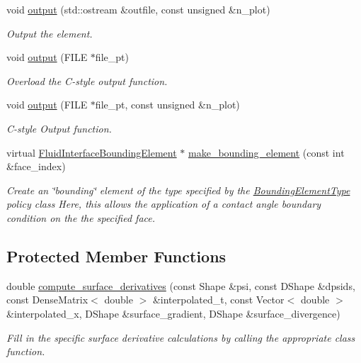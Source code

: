\begin{DoxyCompactItemize}
void \hyperlink{classoomph_1_1SpineUpdateFluidInterfaceElement_a3c9c00def11f68f48db0f46004f1e6fe}{output} (std\+::ostream \&outfile, const unsigned \&n\+\_\+plot)
\begin{DoxyCompactList}\small\item\em Output the element. \end{DoxyCompactList}\item 
void \hyperlink{classoomph_1_1SpineUpdateFluidInterfaceElement_a963fdd8b603e563da9fb966e0c429457}{output} (F\+I\+LE $\ast$file\+\_\+pt)
\begin{DoxyCompactList}\small\item\em Overload the C-\/style output function. \end{DoxyCompactList}\item 
void \hyperlink{classoomph_1_1SpineUpdateFluidInterfaceElement_af876d90d19b6faa253260193ded3f175}{output} (F\+I\+LE $\ast$file\+\_\+pt, const unsigned \&n\+\_\+plot)
\begin{DoxyCompactList}\small\item\em C-\/style Output function. \end{DoxyCompactList}\item 
virtual \hyperlink{classoomph_1_1FluidInterfaceBoundingElement}{Fluid\+Interface\+Bounding\+Element} $\ast$ \hyperlink{classoomph_1_1SpineUpdateFluidInterfaceElement_a8e464c689a19ce2d6fbff2c167dcc41a}{make\+\_\+bounding\+\_\+element} (const int \&face\+\_\+index)
\begin{DoxyCompactList}\small\item\em Create an \char`\"{}bounding\char`\"{} element of the type specified by the \hyperlink{classoomph_1_1BoundingElementType}{Bounding\+Element\+Type} policy class Here, this allows the application of a contact angle boundary condition on the the specified face. \end{DoxyCompactList}\end{DoxyCompactItemize}
\subsection*{Protected Member Functions}
\begin{DoxyCompactItemize}
\item 
double \hyperlink{classoomph_1_1SpineUpdateFluidInterfaceElement_a75debcd348674d5ea58bfefc0e72b737}{compute\+\_\+surface\+\_\+derivatives} (const Shape \&psi, const D\+Shape \&dpsids, const Dense\+Matrix$<$ double $>$ \&interpolated\+\_\+t, const Vector$<$ double $>$ \&interpolated\+\_\+x, D\+Shape \&surface\+\_\+gradient, D\+Shape \&surface\+\_\+divergence)
\begin{DoxyCompactList}\small\item\em Fill in the specific surface derivative calculations by calling the appropriate class function. \end{DoxyCompactList}\end{DoxyCompactItemize}

